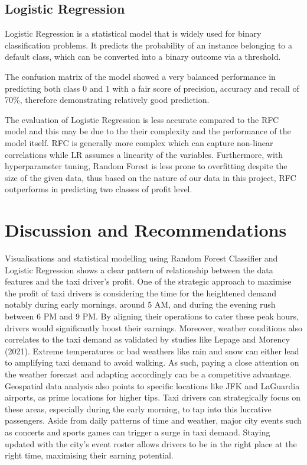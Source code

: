 \documentclass[11pt]{article}
\begin{document}
\subsection{Logistic Regression}
Logistic Regression is a statistical model that is widely used for binary classification problems. It predicts the probability of an instance belonging to a default class, which can be converted into a binary outcome via a threshold.

The confusion matrix of the model showed a very balanced performance in predicting both class 0 and 1 with a fair score of precision, accuracy and recall of 70\%, therefore demonstrating relatively good prediction.  

The evaluation of Logistic Regression is less accurate compared to the RFC model and this may be due to the their complexity and the performance of the model itself. RFC is generally more complex which can capture non-linear correlations while LR assumes a linearity of the variables. Furthermore, with hyperparameter tuning, Random Forest is less prone to overfitting despite the size of the given data, thus based on the nature of our data in this project, RFC outperforms in predicting two classes of profit level. 

\section{Discussion and Recommendations}
Visualisations and statistical modelling using Random Forest Classifier and Logistic Regression shows a clear pattern of relationship between the data features and the taxi driver's profit. One of the strategic approach to maximise the profit of taxi drivers is considering the time for the heightened demand notably during early mornings, around 5 AM, and during the evening rush between 6 PM and 9 PM. By aligning their operations to cater these peak hours, drivers would significantly boost their earnings. Moreover, weather conditions also correlates to the taxi demand as validated by studies like Lepage and Morency (2021)\cite{Lepage:2022}. Extreme temperatures or bad weathers like rain and snow can either lead to amplifying taxi demand to avoid walking. As such, paying a close attention on the weather forecast and adapting accordingly can be a competitive advantage. Geospatial data analysis also points to specific locations like JFK and LaGuardia airports, as prime locations for higher tips. Taxi drivers can strategically focus on these areas, especially during the early morning, to tap into this lucrative passengers. Aside from daily patterns of time and weather, major city events such as concerts and sports games can trigger a surge in taxi demand.  Staying updated with the city's event roster allows drivers to be in the right place at the right time, maximising their earning potential.
\end{document}

